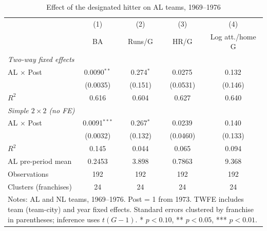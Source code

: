 \begin{table}[htbp]\centering
\caption{Effect of the designated hitter on AL teams, 1969--1976}
\label{tab:did_main}
\begin{tabular}{lcccc}
\hline\hline
 & (1) & (2) & (3) & (4) \\
 & BA & Runs/G & HR/G & Log att./home G \\
\hline
\multicolumn{5}{l}{\textit{Two-way fixed effects}} \\
AL $\times$ Post & 0.0090$^{**}$ & 0.274$^{*}$ & 0.0275$^{}$ & 0.132$^{}$ \\
 & (0.0035) & (0.151) & (0.0531) & (0.146) \\
$R^2$ & 0.616 & 0.604 & 0.627 & 0.640 \\
[0.5ex]
\multicolumn{5}{l}{\textit{Simple $2\times2$ (no FE)}} \\
AL $\times$ Post & 0.0091$^{***}$ & 0.267$^{*}$ & 0.0239$^{}$ & 0.140$^{}$ \\
 & (0.0032) & (0.132) & (0.0460) & (0.133) \\
$R^2$ & 0.145 & 0.044 & 0.065 & 0.094 \\
[0.5ex]
\hline
AL pre-period mean & 0.2453 & 3.898 & 0.7863 & 9.368 \\
Observations & 192 & 192 & 192 & 192 \\
Clusters (franchises) & 24 & 24 & 24 & 24 \\
\hline\hline
\multicolumn{5}{p{0.9\linewidth}}{\footnotesize Notes: AL and NL teams, 1969--1976. Post = 1 from 1973. TWFE includes team (team-city) and year fixed effects. Standard errors clustered by franchise in parentheses; inference uses $t(G-1)$. * $p<0.10$, ** $p<0.05$, *** $p<0.01$.} \\
\end{tabular}
\end{table}
